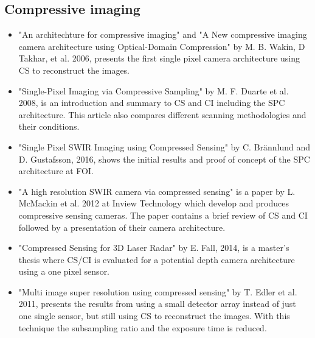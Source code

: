 \subsection{Compressive imaging}
\begin{itemize}

\item \cite{article:an_Arcitecture_for_CI,article:a_new_ci_arc} "An architechture for compressive imaging" and "A New compressive imaging camera architecture using Optical-Domain Compression" by M. B. Wakin, D Takhar, et al. 2006, presents the first single pixel camera architecture using CS to reconstruct the images. 

\item \cite{article:single_pixel_im_cs} "Single-Pixel Imaging via Compressive Sampling" by M. F. Duarte et al. 2008, is an introduction and summary to CS and CI including the SPC architecture. This article also compares different scanning methodologies and their conditions.   

\item \cite{article:foiSPIS} "Single Pixel SWIR Imaging using Compressed Sensing" by C. Brännlund and D. Gustafsson, 2016, shows the initial results and proof of concept of the SPC architecture at FOI.
  


\item \cite{article:a_high_res_swir} "A high resolution SWIR camera via compressed sensing" is a paper by L. McMackin et al. 2012 at Inview Technology which develop and produces compressive sensing cameras. The paper contains a brief review of CS and CI followed by a presentation of their camera architecture. 

 
\item \cite{mt:EF} "Compressed Sensing for 3D Laser Radar" by E. Fall, 2014, is a master's thesis where CS/CI is evaluated for a potential depth camera architecture using a one pixel sensor.   

\item \cite{article:misuperres} "Multi image super resolution using compressed sensing" by T. Edler et al. 2011, presents the results from using a small detector array instead of just one single sensor, but still using CS to reconstruct the images. With this technique the subsampling ratio and the exposure time is reduced. 

 
	
\end{itemize}
    
